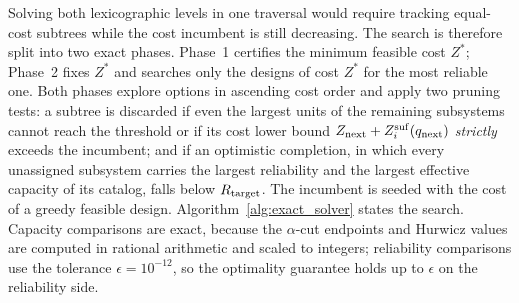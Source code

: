 \documentclass[Review,sagev,times]{sagej}%
\begin{document}
Solving both lexicographic levels in one traversal would require tracking equal-cost subtrees while the cost
incumbent is still decreasing. The search is therefore split into two exact phases. Phase~1 certifies the
minimum feasible cost $Z^*$; Phase~2 fixes $Z^*$ and searches only the designs of cost $Z^*$ for the most
reliable one. Both phases explore options in ascending cost order and apply two pruning tests: a subtree is
discarded if even the largest units of the remaining subsystems cannot reach the threshold or if its cost lower
bound $Z_{\mathrm{next}}+Z^{\mathrm{suf}}_i(q_{\mathrm{next}})$ \emph{strictly} exceeds the incumbent; and if an optimistic
completion, in which every unassigned subsystem carries the largest reliability and the largest effective
capacity of its catalog, falls below $R_{\mathrm{target}}$. The incumbent is seeded with the cost of a greedy feasible
design. Algorithm~\ref{alg:exact_solver} states the search. Capacity comparisons are exact, because the
$\alpha$-cut endpoints and Hurwicz values are computed in rational arithmetic and scaled to integers;
reliability comparisons use the tolerance $\epsilon = 10^{-12}$, so the optimality guarantee holds up to
$\epsilon$ on the reliability side.
\end{document}
